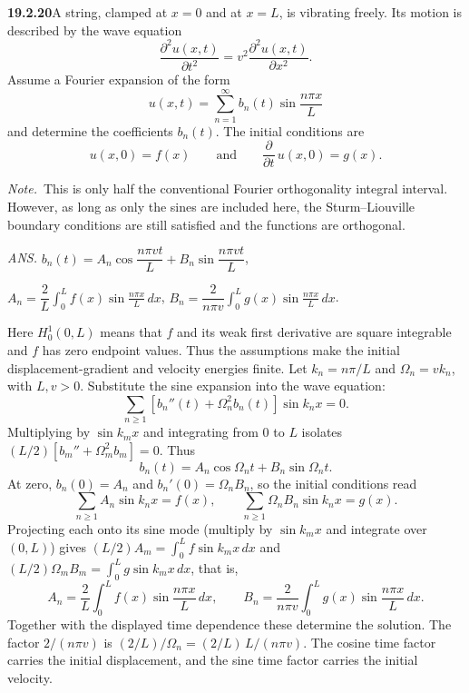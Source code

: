 \par\bigskip
\noindent\textbf{19.2.20}\quad A string, clamped at $x=0$ and at
$x=L$, is vibrating freely. Its motion is described by the wave
equation
\[
\frac{\partial^{2}u(x,t)}{\partial t^{2}}
=v^{2}\frac{\partial^{2}u(x,t)}{\partial x^{2}}.
\]
Assume a Fourier expansion of the form
\[
u(x,t)=\sum_{n=1}^{\infty}b_{n}(t)\sin\frac{n\pi x}{L}
\]
and determine the coefficients $b_{n}(t)$. The initial conditions
are
\[
u(x,0)=f(x)\qquad\text{and}\qquad
\frac{\partial}{\partial t}\,u(x,0)=g(x).
\]
\par\emph{Note.}~This is only half the conventional Fourier
orthogonality integral interval. However, as long as only the
sines are included here, the Sturm--Liouville boundary conditions
are still satisfied and the functions are orthogonal.
\par\nobreak\hfill\emph{ANS.}\enspace
$b_{n}(t)=A_{n}\cos\dfrac{n\pi vt}{L}+B_{n}\sin
\dfrac{n\pi vt}{L}$,\par\nobreak
\hfill$A_{n}=\dfrac{2}{L}\displaystyle\int_{0}^{L}
f(x)\sin\frac{n\pi x}{L}\,dx$,\quad
$B_{n}=\dfrac{2}{n\pi v}\displaystyle\int_{0}^{L}
g(x)\sin\frac{n\pi x}{L}\,dx$.
\par\smallskip
{}
\solution
Here $H_0^1(0,L)$ means that $f$ and its weak first derivative are
square integrable and $f$ has zero endpoint values. Thus the assumptions
make the initial displacement-gradient and velocity energies finite.
Let $k_n=n\pi/L$ and $\Omega_n=vk_n$, with $L,v>0$.
Substitute the sine expansion into the wave equation:
\[
\sum_{n\ge1}[b_n''(t)+\Omega_n^2b_n(t)]\sin k_nx=0.
\]
Multiplying by $\sin k_mx$ and integrating from $0$ to $L$ isolates
$(L/2)[b_m''+\Omega_m^2b_m]=0$. Thus
\[
b_n(t)=A_n\cos\Omega_nt+B_n\sin\Omega_nt.
\]
At zero, $b_n(0)=A_n$ and $b_n'(0)=\Omega_nB_n$, so the initial
conditions read
\[
\sum_{n\ge1}A_n\sin k_nx=f(x),\qquad
\sum_{n\ge1}\Omega_nB_n\sin k_nx=g(x).
\]
Projecting each onto its sine mode (multiply by $\sin k_mx$ and
integrate over $(0,L)$) gives $(L/2)A_m=\int_0^Lf\sin k_mx\,dx$ and
$(L/2)\Omega_mB_m=\int_0^Lg\sin k_mx\,dx$, that is,
\[
\boxed{A_n=\frac2L\int_0^Lf(x)\sin\frac{n\pi x}{L}\,dx,\qquad
 B_n=\frac{2}{n\pi v}\int_0^Lg(x)\sin\frac{n\pi x}{L}\,dx.}
\]
Together with the displayed time dependence these determine the solution.
The factor $2/(n\pi v)$ is $(2/L)/\Omega_n=(2/L)\,L/(n\pi v)$. The
cosine time factor carries the initial displacement, and the sine time
factor carries the initial velocity.

